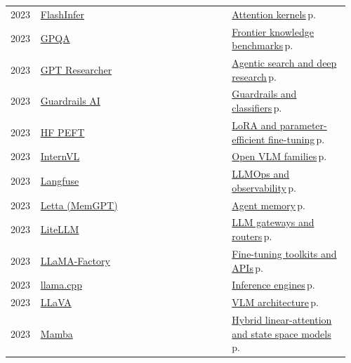\documentclass[10pt,a4paper,openany]{report}
\begin{document}
{\begin{longtable}{@{}p{0.07\linewidth}>{\raggedright}p{0.55\linewidth}>{\raggedright\arraybackslash}p{0.34\linewidth}@{}}
2023 & \href{https://github.com/flashinfer-ai/flashinfer}{FlashInfer} & \hyperref[c:inference-5]{Attention kernels}\,{\color{muted}\scriptsize p.\,\pageref{c:inference-5}}\\
2023 & \href{https://github.com/idavidrein/gpqa}{GPQA} & \hyperref[c:evals-6]{Frontier knowledge benchmarks}\,{\color{muted}\scriptsize p.\,\pageref{c:evals-6}}\\
2023 & \href{https://github.com/assafelovic/gpt-researcher}{GPT Researcher} & \hyperref[c:context-6]{Agentic search and deep research}\,{\color{muted}\scriptsize p.\,\pageref{c:context-6}}\\
2023 & \href{https://github.com/guardrails-ai/guardrails}{Guardrails AI} & \hyperref[c:safety-5]{Guardrails and classifiers}\,{\color{muted}\scriptsize p.\,\pageref{c:safety-5}}\\
2023 & \href{https://github.com/huggingface/peft}{HF PEFT} & \hyperref[c:training-5]{LoRA and parameter-efficient fine-tuning}\,{\color{muted}\scriptsize p.\,\pageref{c:training-5}}\\
2023 & \href{https://github.com/OpenGVLab/InternVL}{InternVL} & \hyperref[c:vlm-1]{Open VLM families}\,{\color{muted}\scriptsize p.\,\pageref{c:vlm-1}}\\
2023 & \href{https://github.com/langfuse/langfuse}{Langfuse} & \hyperref[c:practice-5]{LLMOps and observability}\,{\color{muted}\scriptsize p.\,\pageref{c:practice-5}}\\
2023 & \href{https://github.com/letta-ai/letta}{Letta (MemGPT)} & \hyperref[c:context-4]{Agent memory}\,{\color{muted}\scriptsize p.\,\pageref{c:context-4}}\\
2023 & \href{https://github.com/BerriAI/litellm}{LiteLLM} & \hyperref[c:inference-7]{LLM gateways and routers}\,{\color{muted}\scriptsize p.\,\pageref{c:inference-7}}\\
2023 & \href{https://github.com/hiyouga/LLaMA-Factory}{LLaMA-Factory} & \hyperref[c:training-6]{Fine-tuning toolkits and APIs}\,{\color{muted}\scriptsize p.\,\pageref{c:training-6}}\\
2023 & \href{https://github.com/ggml-org/llama.cpp}{llama.cpp} & \hyperref[c:inference-0]{Inference engines}\,{\color{muted}\scriptsize p.\,\pageref{c:inference-0}}\\
2023 & \href{https://github.com/haotian-liu/LLaVA}{LLaVA} & \hyperref[c:vlm-0]{VLM architecture}\,{\color{muted}\scriptsize p.\,\pageref{c:vlm-0}}\\
2023 & \href{https://github.com/state-spaces/mamba}{Mamba} & \hyperref[c:arch-4]{Hybrid linear-attention and state space models}\,{\color{muted}\scriptsize p.\,\pageref{c:arch-4}}\\

\end{longtable}}
\end{document}
